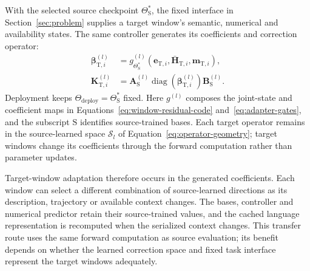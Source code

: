 \documentclass[journal]{IEEEtran}
\begin{document}
With the selected source checkpoint $\Theta_{\mathrm S}^*$, the fixed interface in Section~\ref{sec:problem} supplies a target window's semantic, numerical and availability states. The same controller generates its coefficients and correction operator:
\begin{equation}
\label{eq:zero-shot-operator}
\begin{aligned}
\boldsymbol\beta_{\mathrm T,i}^{(l)}
&=g_{\Theta_{\mathrm S}^*}^{(l)}
(\mathbf e_{\mathrm T,i},\bar{\mathbf H}_{\mathrm T,i},\mathbf m_{\mathrm T,i}),\\
\mathbf K_{\mathrm T,i}^{(l)}
&=\mathbf A_{\mathrm S}^{(l)}
\operatorname{diag}(\boldsymbol\beta_{\mathrm T,i}^{(l)})
\mathbf B_{\mathrm S}^{(l)}.
\end{aligned}
\end{equation}
Deployment keeps $\Theta_{\mathrm{deploy}}=\Theta_{\mathrm S}^*$ fixed. Here $g^{(l)}$ composes the joint-state and coefficient maps in Equations~\eqref{eq:window-residual-code} and~\eqref{eq:adapter-gates}, and the subscript $\mathrm S$ identifies source-trained bases. Each target operator remains in the source-learned space $\mathcal S_l$ of Equation~\eqref{eq:operator-geometry}; target windows change its coefficients through the forward computation rather than parameter updates.

Target-window adaptation therefore occurs in the generated coefficients. Each window can select a different combination of source-learned directions as its description, trajectory or available context changes. The bases, controller and numerical predictor retain their source-trained values, and the cached language representation is recomputed when the serialized context changes. This transfer route uses the same forward computation as source evaluation; its benefit depends on whether the learned correction space and fixed task interface represent the target windows adequately.
\end{document}
